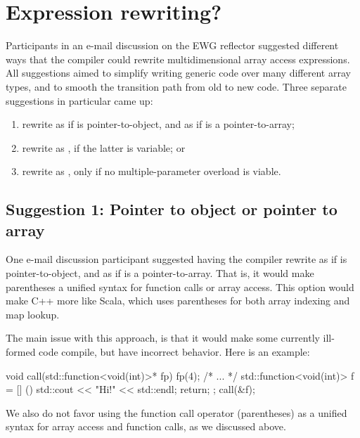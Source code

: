 \documentclass{wg21}
\begin{document}
\section{Expression rewriting?}

Participants in an e-mail discussion on the EWG reflector suggested different ways that the compiler could rewrite multidimensional array access expressions.  All suggestions aimed to simplify writing generic code over many different array types, and to smooth the transition path from old to new code.  Three separate suggestions in particular came up:

\begin{enumerate}
\item rewrite  as  if  is pointer-to-object, and  as  if  is a pointer-to-array;
\item rewrite  as , if the latter is variable; or
\item rewrite  as , only if no multiple-parameter  overload is viable.
\end{enumerate}

\subsection{Suggestion 1: Pointer to object or pointer to array}

One e-mail discussion participant suggested having the compiler rewrite  as  if  is pointer-to-object, and  as  if  is a pointer-to-array.  That is, it would make parentheses a unified syntax for function calls or array access.  This option would make C++ more like Scala, which uses parentheses for both array indexing and map lookup.

The main issue with this approach, is that it would make some currently ill-formed code compile, but have incorrect behavior.  Here is an example:

\begin{colorblock}
void call(std::function<void(int)>* fp) {
    fp(4);
}
/* ... */
std::function<void(int)> f = [] () {
    std::cout << "Hi!" << std::endl;
    return;
};
call(&f);
\end{colorblock}

We also do not favor using the function call operator (parentheses) as a unified syntax for array access and function calls, as we discussed above.
\end{document}
